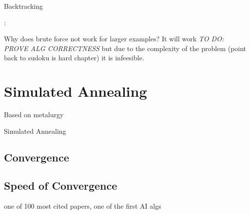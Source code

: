 \documentclass[a4paper,11pt]{report}
\newcounter{row}
\newcounter{col}
\begin{document}
\begin{algorithm}
\caption{Backtracking}
\begin{algorithmic}
                \Else:
	       \EndIf
		\EndIf
\EndIf
\EndFor
\EndFor
\EndProcedure						
\end{algorithmic}
\end{algorithm}
Why does brute force not work for larger examples? It will work \textit{TO DO: PROVE ALG CORRECTNESS} but due to the complexity of the problem (point back to sudoku is hard chapter) it is infeesible.

\section{Simulated Annealing} 

Based on metalurgy

\begin{algorithm}
\caption{Simulated Annealing}
\begin{algorithmic}
		\Else
			\EndIf
		\EndIf
	\EndFor
\EndProcedure
\end{algorithmic}
\end{algorithm}

\subsection{Convergence}
\subsection{Speed of Convergence}
\cite{simulatedannealing} one of 100 most cited papers, one of the first AI algs

\end{document}
